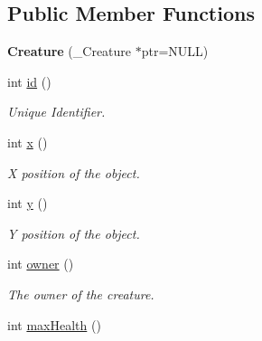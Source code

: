 \subsection*{\-Public \-Member \-Functions}
\begin{DoxyCompactItemize}
\item 
\hypertarget{classCreature_ace232a360d8998eaf997a77525f3144e}{{\bfseries \-Creature} (\-\_\-\-Creature $\ast$ptr=\-N\-U\-L\-L)}\label{classCreature_ace232a360d8998eaf997a77525f3144e}

\item 
\hypertarget{classCreature_aeed0dd3ce4e773fa8b829d1febda40ba}{int \hyperlink{classCreature_aeed0dd3ce4e773fa8b829d1febda40ba}{id} ()}\label{classCreature_aeed0dd3ce4e773fa8b829d1febda40ba}

\begin{DoxyCompactList}\small\item\em \-Unique \-Identifier. \end{DoxyCompactList}\item 
\hypertarget{classCreature_a356a4d67f5e39929cbd83303fd9a1a32}{int \hyperlink{classCreature_a356a4d67f5e39929cbd83303fd9a1a32}{x} ()}\label{classCreature_a356a4d67f5e39929cbd83303fd9a1a32}

\begin{DoxyCompactList}\small\item\em \-X position of the object. \end{DoxyCompactList}\item 
\hypertarget{classCreature_a3d5b3216f5d659a16f5ea9dacc5e3463}{int \hyperlink{classCreature_a3d5b3216f5d659a16f5ea9dacc5e3463}{y} ()}\label{classCreature_a3d5b3216f5d659a16f5ea9dacc5e3463}

\begin{DoxyCompactList}\small\item\em \-Y position of the object. \end{DoxyCompactList}\item 
\hypertarget{classCreature_ada858e8e49d05e11f19f88994141e9a6}{int \hyperlink{classCreature_ada858e8e49d05e11f19f88994141e9a6}{owner} ()}\label{classCreature_ada858e8e49d05e11f19f88994141e9a6}

\begin{DoxyCompactList}\small\item\em \-The owner of the creature. \end{DoxyCompactList}\item 
\hypertarget{classCreature_a5943058c00c1028c8174c6ba2a8aa97f}{int \hyperlink{classCreature_a5943058c00c1028c8174c6ba2a8aa97f}{max\-Health} ()}\label{classCreature_a5943058c00c1028c8174c6ba2a8aa97f}


\end{DoxyCompactItemize}
